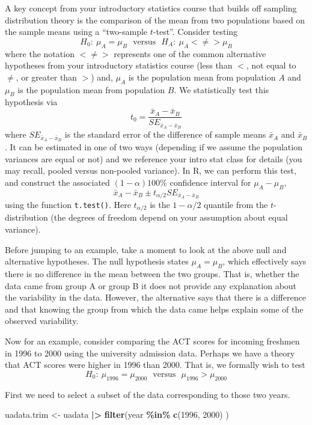 \documentclass[
]{book}
\newenvironment{Shaded}{\begin{snugshade}}{\end{snugshade}}
\newcommand{\DecValTok}[1]{\textcolor[rgb]{0.00,0.00,0.81}{#1}}
\newcommand{\FunctionTok}[1]{\textcolor[rgb]{0.13,0.29,0.53}{\textbf{#1}}}
\newcommand{\NormalTok}[1]{#1}
\newcommand{\OtherTok}[1]{\textcolor[rgb]{0.56,0.35,0.01}{#1}}
\newcommand{\SpecialCharTok}[1]{\textcolor[rgb]{0.81,0.36,0.00}{\textbf{#1}}}
\begin{document}
A key concept from your introductory statistics course that builds off sampling distribution theory is the comparison of the mean from two populations based on the sample means using a ``two-sample \(t\)-test''.
Consider testing
\[H_0:\ \mu_A = \mu_B ~~~\textrm{versus}~~~ H_A:\ \mu_A <\neq> \mu_B\]
where the notation \(<\neq>\) represents one of the common alternative hypotheses from your introductory statistics course (less than \(<\), not equal to \(\neq\), or greater than \(>\)) and, \(\mu_A\) is the population mean from population \(A\) and \(\mu_B\) is the population mean from population \(B\).
We statistically test this hypothesis via
\[t_0 = \frac{\bar{x}_A - \bar{x}_B}{{SE}_{\bar{x}_A-\bar{x}_B}}\]
where \({SE}_{\bar{x}_A-\bar{x}_B}\) is the standard error of the difference of sample means \(\bar{x}_A\) and \(\bar{x}_B\).
It can be estimated in one of two ways (depending if we assume the population variances are equal or not) and we reference your intro stat class for details (you may recall, pooled versus non-pooled variance).
In R, we can perform this test, and construct the associated \((1-\alpha)100\%\) confidence interval for \(\mu_A-\mu_B\),
\[\bar{x}_A - \bar{x}_B \pm t_{\alpha/2} {SE}_{\bar{x}_A-\bar{x}_B}\]
using the function \texttt{t.test()}.
Here \(t_{\alpha/2}\) is the \(1-\alpha/2\) quantile from the \(t\)-distribution (the degrees of freedom depend on your assumption about equal variance).

Before jumping to an example, take a moment to look at the above null and alternative hypotheses.
The null hypothesis states \(\mu_A=\mu_B\), which effectively says there is no difference in the mean between the two groups.
That is, whether the data came from group A or group B it does not provide any explanation about the variability in the data.
However, the alternative says that there is a difference and that knowing the group from which the data came helps explain some of the observed variability.

Now for an example, consider comparing the ACT scores for incoming freshmen in 1996 to 2000 using the university admission data. Perhaps we have a theory that ACT scores were higher in 1996 than 2000.
That is, we formally wish to test \[H_0:\ \mu_{1996} = \mu_{2000} ~~~\textrm{versus}~~~ \mu_{1996} > \mu_{2000}\]

First we need to select a subset of the data corresponding to those two years.

\begin{Shaded}
\begin{Highlighting}[]
\NormalTok{uadata.trim }\OtherTok{\textless{}{-}}\NormalTok{ uadata }\SpecialCharTok{|\textgreater{}}
  \FunctionTok{filter}\NormalTok{(year }\SpecialCharTok{\%in\%} \FunctionTok{c}\NormalTok{(}\DecValTok{1996}\NormalTok{, }\DecValTok{2000}\NormalTok{) )}
\end{Highlighting}
\end{Shaded}
\end{document}
